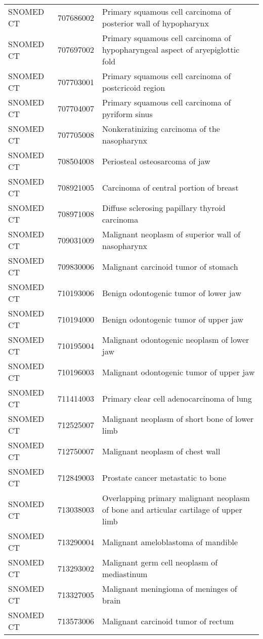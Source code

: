 \begin{longtable}{p{}p{}p{}}
  SNOMED CT & 707686002 & Primary squamous cell carcinoma of posterior wall of hypopharynx \\ 
  SNOMED CT & 707697002 & Primary squamous cell carcinoma of hypopharyngeal aspect of aryepiglottic fold \\ 
  SNOMED CT & 707703001 & Primary squamous cell carcinoma of postcricoid region \\ 
  SNOMED CT & 707704007 & Primary squamous cell carcinoma of pyriform sinus \\ 
  SNOMED CT & 707705008 & Nonkeratinizing carcinoma of the nasopharynx \\ 
  SNOMED CT & 708504008 & Periosteal osteosarcoma of jaw \\ 
  SNOMED CT & 708921005 & Carcinoma of central portion of breast \\ 
  SNOMED CT & 708971008 & Diffuse sclerosing papillary thyroid carcinoma \\ 
  SNOMED CT & 709031009 & Malignant neoplasm of superior wall of nasopharynx \\ 
  SNOMED CT & 709830006 & Malignant carcinoid tumor of stomach \\ 
  SNOMED CT & 710193006 & Benign odontogenic tumor of lower jaw \\ 
  SNOMED CT & 710194000 & Benign odontogenic tumor of upper jaw \\ 
  SNOMED CT & 710195004 & Malignant odontogenic neoplasm of lower jaw \\ 
  SNOMED CT & 710196003 & Malignant odontogenic tumor of upper jaw \\ 
  SNOMED CT & 711414003 & Primary clear cell adenocarcinoma of lung \\ 
  SNOMED CT & 712525007 & Malignant neoplasm of short bone of lower limb \\ 
  SNOMED CT & 712750007 & Malignant neoplasm of chest wall \\ 
  SNOMED CT & 712849003 & Prostate cancer metastatic to bone \\ 
  SNOMED CT & 713038003 & Overlapping primary malignant neoplasm of bone and articular cartilage of upper limb \\ 
  SNOMED CT & 713290004 & Malignant ameloblastoma of mandible \\ 
  SNOMED CT & 713293002 & Malignant germ cell neoplasm of mediastinum \\ 
  SNOMED CT & 713327005 & Malignant meningioma of meninges of brain \\ 
  SNOMED CT & 713573006 & Malignant carcinoid tumor of rectum \\ 

\end{longtable}

